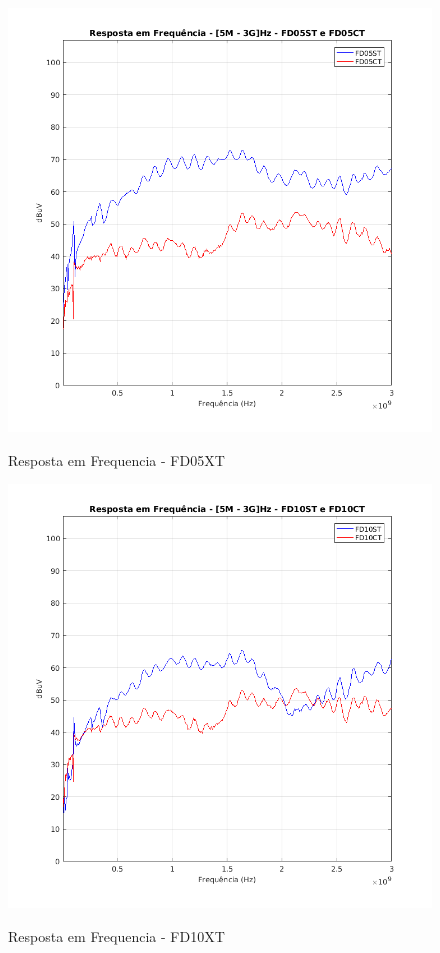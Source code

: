 
\begin{figure}[H]
	\centering 
	\caption{Resposta em Frequencia - FD05XT}
	\includegraphics[scale=0.7]{./img/FD05XT}
	\label{fig:FD05XT}
\end{figure}

\begin{figure}[H]
	\centering 
	\caption{Resposta em Frequencia - FD10XT}
	\includegraphics[scale=0.7]{./img/FD10XT}
	\label{fig:FD10XT}
\end{figure}

